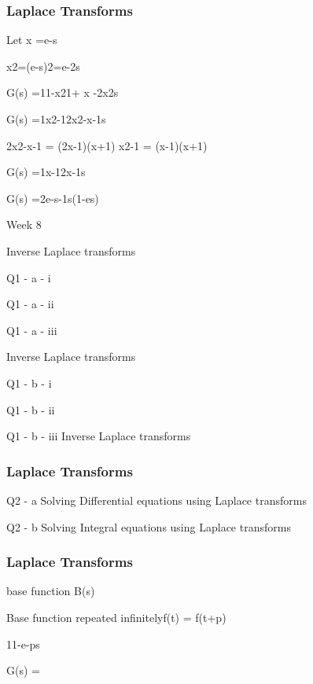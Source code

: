\begin{frame}
\frametitle{Laplace Transforms}
\Large 
 
Let     x =e-s
 
        x2=(e-s)2=e-2s
 
G(s) =11-x21+ x -2x2s
 
G(s) =1x2-12x2-x-1s
 
2x2-x-1 = (2x-1)(x+1)
x2-1 = (x-1)(x+1)
 
 
G(s) =1x-12x-1s 
 
G(s) =2e-s-1s(1-es)
 
  
Week 8

Inverse Laplace transforms

Q1 - a - i

Q1 - a - ii

Q1 - a - iii

Inverse Laplace transforms

Q1 - b - i

Q1 - b - ii

Q1 - b - iii
Inverse Laplace transforms

\end{frame}
\begin{frame}
\frametitle{Laplace Transforms}
\Large

Q2 - a
Solving Differential equations using Laplace transforms

Q2 - b 
Solving Integral equations using Laplace transforms

\end{frame}
\begin{frame}
\frametitle{Laplace Transforms}
\Large
base function B(s)

Base function repeated infinitelyf(t) = f(t+p)

11-e-ps

G(s)  = 

\end{frame}
